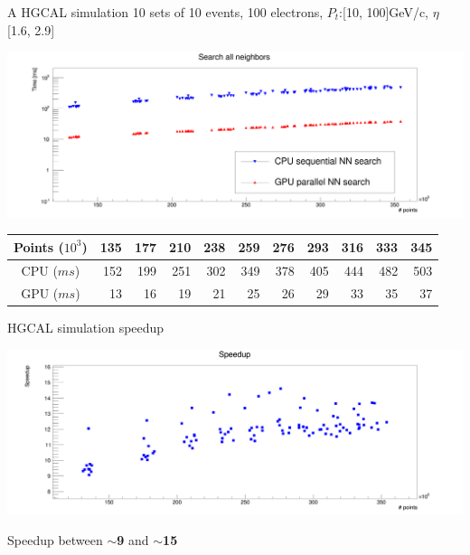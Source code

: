 \documentclass{beamer}
\newenvironment{changemargin}[2]{%
  \begin{list}{}{%
    \setlength{\topsep}{0pt}%
    \setlength{\leftmargin}{#1}%
    \setlength{\rightmargin}{#2}%
    \setlength{\listparindent}{\parindent}%
    \setlength{\itemindent}{\parindent}%
    \setlength{\parsep}{\parskip}%
  }%
  \item[]}{\end{list}}
\begin{document}
\begin{frame}{A HGCAL simulation}
10 sets of 10 events, 100 electrons, $P_t$:[10, 100]GeV/c, $\eta$ [1.6, 2.9]\\
\vspace{5mm}
\begin{changemargin}{-2cm}{-2cm}
\begin{center}
\includegraphics[scale=0.15]{images/RechitsSearchTimes.png}\\
\begin{table}[h]
\begin{tabular}{ c || r r r r r r r r r r}
Points ($10^{3}$) & 135 & 177 & 210 & 238 & 259 & 276 & 293 & 316 & 333 & 345 \\
\hline
CPU ($\unit{ms}$) & 152 & 199 & 251 & 302 & 349 & 378 & 405 & 444 & 482 & 503 \\
GPU ($\unit{ms}$) & 13 & 16 & 19 & 21 & 25 & 26 & 29 & 33 & 35 & 37 \\
\end{tabular}
\end{table}
\end{center}
\end{changemargin}
\end{frame}

\begin{frame}{HGCAL simulation speedup}
\begin{changemargin}{-2cm}{-2cm}
\begin{center}
\includegraphics[scale=0.15]{images/RechitsSpeedup.png}
\end{center}
\end{changemargin}
\vspace{5mm}
Speedup between \textbf{$\sim$9} and \textbf{$\sim$15}
\end{frame}
\end{document}
